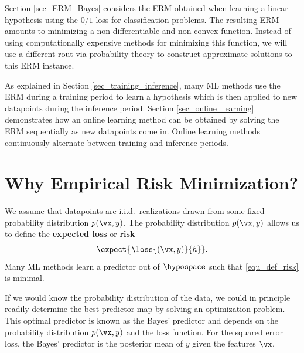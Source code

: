 \documentclass[12pt]{report}
\begin{document}
Section \ref{sec_ERM_Bayes} considers the ERM obtained when learning a linear hypothesis 
using the $0/1$ loss for classification problems. The resulting ERM 
amounts to minimizing a non-differentiable and non-convex function. 
Instead of using computationally expensive methods for minimizing 
this function, we will use a different rout via probability theory to 
construct approximate solutions to this ERM instance. 

As explained in Section \ref{sec_training_inference}, many ML methods 
use the ERM during a training period to learn a hypothesis which is 
then applied to new datapoints during the inference period. 
Section \ref{sec_online_learning} demonstrates how an online 
learning method can be obtained by solving the ERM sequentially 
as new datapoints come in. Online learning methods continuously 
alternate between training and inference periods. 



\section{Why Empirical Risk Minimization?} 
\label{equ_sec_emp_risk_approximates_expected_loss}

We assume that datapoints are i.i.d.\ realizations drawn from some fixed 
probability distribution $p(\vx,y)$. The probability distribution $p(\vx,y)$ 
allows us to define the {\bf expected loss} or {\bf risk} 
\begin{equation}
\label{equ_def_risk} 
\expect \big \{ \loss{(\vx,y)}{h} \}.
\end{equation}
Many ML methods learn a predictor out of $\hypospace$ such 
that \eqref{equ_def_risk} is minimal. 

If we would know the probability distribution of the data, we could 
in principle readily determine the best predictor map by solving an 
optimization problem. This optimal predictor is known as the Bayes' 
predictor and depends on the probability distribution $p(\vx,y)$ 
and the loss function. For the squared error loss, the Bayes' 
predictor is the posterior mean of $y$ given the features $\vx$. 
\end{document}
